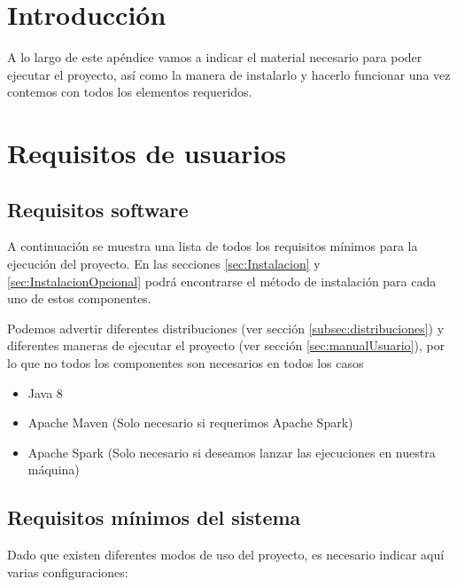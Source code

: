 
\section{Introducción}

A lo largo de este apéndice vamos a indicar el material necesario para poder ejecutar el proyecto, así como la manera de instalarlo y hacerlo funcionar una vez contemos con todos los elementos requeridos.

\section{Requisitos de usuarios}

\subsection{Requisitos software}\label{sec:ReqSoftware}

A continuación se muestra una lista de todos los requisitos mínimos para la ejecución del proyecto. En las secciones \ref{sec:Instalacion} y \ref{sec:InstalacionOpcional} podrá encontrarse el método de instalación para cada uno de estos componentes.

Podemos advertir diferentes distribuciones (ver sección \ref{subsec:distribuciones}) y diferentes maneras de ejecutar el proyecto (ver sección \ref{sec:manualUsuario}), por lo que no todos los componentes son necesarios en todos los casos

\begin{itemize}
\item Java 8
\item Apache Maven (Solo necesario si requerimos Apache Spark)
\item Apache Spark (Solo necesario si deseamos lanzar las ejecuciones en nuestra máquina)
\end{itemize}

\subsection{Requisitos mínimos del sistema}

Dado que existen diferentes modos de uso del proyecto, es necesario indicar aquí varias configuraciones:

